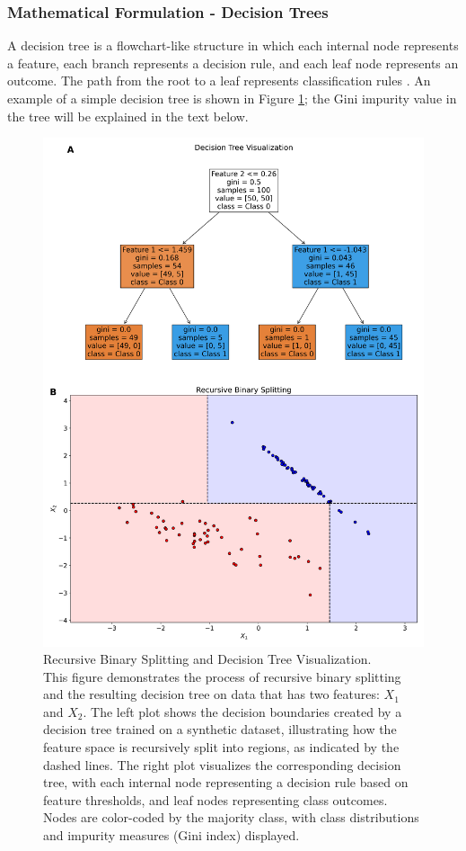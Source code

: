 \documentclass[english,11pt,a4paper,titlepage]{article}
\begin{document}
	\subsubsection*{Mathematical Formulation - Decision Trees}
	A decision tree is a flowchart-like structure in which each internal node represents a feature, each branch represents a decision rule, and each leaf node represents an outcome. The path from the root to a leaf represents classification rules \cite{hastieElementsStatisticalLearning2009}. An example of a simple decision tree is shown in Figure \ref{fig:decisiontreevisualization}; the Gini impurity value in the tree will be explained in the text below.
	
	\begin{figure}[h]
		\centering
		\includegraphics[width=1.0\linewidth]{img/decision_tree}
		\caption{Recursive Binary Splitting and Decision Tree Visualization. \\ This figure demonstrates the process of recursive binary splitting and the resulting decision tree on data that has two features: $X_1$ and $X_2$. The left plot shows the decision boundaries created by a decision tree trained on a synthetic dataset, illustrating how the feature space is recursively split into regions, as indicated by the dashed lines. The right plot visualizes the corresponding decision tree, with each internal node representing a decision rule based on feature thresholds, and leaf nodes representing class outcomes. Nodes are color-coded by the majority class, with class distributions and impurity measures (Gini index) displayed.}
		\label{fig:decisiontreevisualization}
	\end{figure}
	
\end{document}
